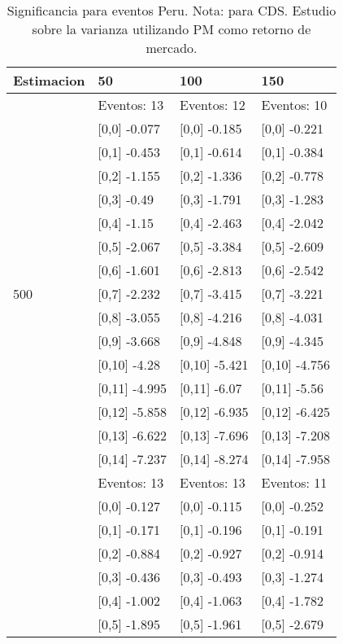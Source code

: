\begin{table}

\caption{Significancia para eventos Peru. Nota: para CDS. Estudio sobre la varianza utilizando PM como retorno de mercado.}
\centering
\begin{tabular}[t]{llll}
\toprule
Estimacion & 50 & 100 & 150\\
\midrule
 & Eventos:  13 & Eventos:  12 & Eventos:  10\\
 & {}[0,0] -0.077 & {}[0,0] -0.185 & {}[0,0] -0.221\\
 & {}[0,1] -0.453 & {}[0,1] -0.614 & {}[0,1] -0.384\\
 & {}[0,2] -1.155 & {}[0,2] -1.336 & {}[0,2] -0.778\\
 & {}[0,3] -0.49 & {}[0,3] -1.791 & {}[0,3] -1.283\\
\addlinespace
 & {}[0,4] -1.15 & {}[0,4] -2.463 & {}[0,4] -2.042\\
 & {}[0,5] -2.067 & {}[0,5] -3.384 & {}[0,5] -2.609\\
 & {}[0,6] -1.601 & {}[0,6] -2.813 & {}[0,6] -2.542\\
500 & {}[0,7] -2.232 & {}[0,7] -3.415 & {}[0,7] -3.221\\
 & {}[0,8] -3.055 & {}[0,8] -4.216 & {}[0,8] -4.031\\
\addlinespace
 & {}[0,9] -3.668 & {}[0,9] -4.848 & {}[0,9] -4.345\\
 & {}[0,10] -4.28 & {}[0,10] -5.421 & {}[0,10] -4.756\\
 & {}[0,11] -4.995 & {}[0,11] -6.07 & {}[0,11] -5.56\\
 & {}[0,12] -5.858 & {}[0,12] -6.935 & {}[0,12] -6.425\\
 & {}[0,13] -6.622 & {}[0,13] -7.696 & {}[0,13] -7.208\\
\addlinespace
 & {}[0,14] -7.237 & {}[0,14] -8.274 & {}[0,14] -7.958\\
 & Eventos:  13 & Eventos:  13 & Eventos:  11\\
 & {}[0,0] -0.127 & {}[0,0] -0.115 & {}[0,0] -0.252\\
 & {}[0,1] -0.171 & {}[0,1] -0.196 & {}[0,1] -0.191\\
 & {}[0,2] -0.884 & {}[0,2] -0.927 & {}[0,2] -0.914\\
\addlinespace
 & {}[0,3] -0.436 & {}[0,3] -0.493 & {}[0,3] -1.274\\
 & {}[0,4] -1.002 & {}[0,4] -1.063 & {}[0,4] -1.782\\
 & {}[0,5] -1.895 & {}[0,5] -1.961 & {}[0,5] -2.679\\

\end{tabular}
\end{table}
